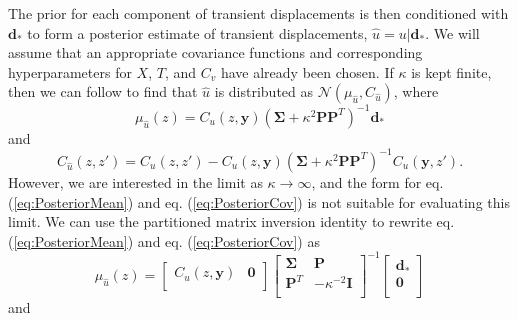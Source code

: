 \documentclass[10pt,letter]{article}
\begin{document}
The prior for each component of transient displacements is then conditioned with $\bm{d}_*$ to form a posterior estimate of transient displacements, $\hat{u} = u | \bm{d}_*$. We will assume that an appropriate covariance functions and corresponding hyperparameters for $X$, $T$, and $C_v$ have already been chosen. If $\kappa$ is kept finite, then we can follow \citet{Rasmussen2006} to find that $\hat{u}$ is distributed as $\mathcal{N}(\mu_{\hat{u}},C_{\hat{u}})$, where
\begin{equation}\label{eq:PosteriorMean}
\mu_{\hat{u}}(z) = C_u(z,\bm{y})\left(\bm{\Sigma} + \kappa^2\bm{P}\bm{P}^T\right)^{-1}\bm{d}_*
\end{equation}    
and
\begin{equation}\label{eq:PosteriorCov}
C_{\hat{u}}(z,z') = C_u(z,z') - C_u(z,\bm{y})\left(\bm{\Sigma} + \kappa^2\bm{P}\bm{P}^T\right)^{-1}C_u(\bm{y},z').
\end{equation}
However, we are interested in the limit as $\kappa \to \infty$, and the form for eq. (\ref{eq:PosteriorMean}) and eq. (\ref{eq:PosteriorCov}) is not suitable for evaluating this limit. We can use the partitioned matrix inversion identity \citep[e.g.,][]{Press2007} to rewrite eq. (\ref{eq:PosteriorMean}) and eq. (\ref{eq:PosteriorCov}) as
 \begin{equation}\label{eq:PosteriorMean2}
\mu_{\hat{u}}(z) = \left[\begin{array}{cc}
                         C_u(z,\bm{y}) & \bm{0} \\
                         \end{array}\right]
                   \left[\begin{array}{cc}
                         \bm{\Sigma} & \bm{P} \\
                         \bm{P}^T  & -\kappa^{-2} \bm{I} \\
                         \end{array}\right]^{-1}
                   \left[\begin{array}{c}
                         \bm{d}_* \\
                         \bm{0} \\
                         \end{array}\right]
\end{equation}    
and
\end{document}
